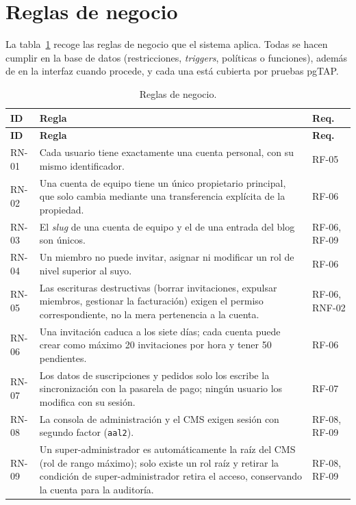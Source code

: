 \section{Reglas de negocio}
\label{sec:ana-reglas}

La tabla~\ref{tab:ana-reglas} recoge las reglas de negocio que el sistema
aplica. Todas se hacen cumplir en la base de datos (restricciones,
\textit{triggers}, políticas o funciones), además de en la interfaz cuando
procede, y cada una está cubierta por pruebas pgTAP.

{\footnotesize
\begin{longtable}{@{}l>{\raggedright\arraybackslash}p{11.4cm}l@{}}
  \caption{Reglas de negocio.}\label{tab:ana-reglas}\\
  \toprule
  \textbf{ID} & \textbf{Regla} & \textbf{Req.} \\
  \midrule
  \endfirsthead
  \toprule
  \textbf{ID} & \textbf{Regla} & \textbf{Req.} \\
  \midrule
  \endhead
  \bottomrule
  \endfoot
  RN-01 & Cada usuario tiene exactamente una cuenta personal, con su mismo identificador. & RF-05 \\
  RN-02 & Una cuenta de equipo tiene un único propietario principal, que solo cambia mediante una transferencia explícita de la propiedad. & RF-06 \\
  RN-03 & El \textit{slug} de una cuenta de equipo y el de una entrada del blog son únicos. & RF-06, RF-09 \\
  RN-04 & Un miembro no puede invitar, asignar ni modificar un rol de nivel superior al suyo. & RF-06 \\
  RN-05 & Las escrituras destructivas (borrar invitaciones, expulsar miembros, gestionar la facturación) exigen el permiso correspondiente, no la mera pertenencia a la cuenta. & RF-06, RNF-02 \\
  RN-06 & Una invitación caduca a los siete días; cada cuenta puede crear como máximo 20 invitaciones por hora y tener 50 pendientes. & RF-06 \\
  RN-07 & Los datos de suscripciones y pedidos solo los escribe la sincronización con la pasarela de pago; ningún usuario los modifica con su sesión. & RF-07 \\
  RN-08 & La consola de administración y el CMS exigen sesión con segundo factor (\texttt{aal2}). & RF-08, RF-09 \\
  RN-09 & Un super-administrador es automáticamente la raíz del CMS (rol de rango máximo); solo existe un rol raíz y retirar la condición de super-administrador retira el acceso, conservando la cuenta para la auditoría. & RF-08, RF-09 \\

\end{longtable}}
